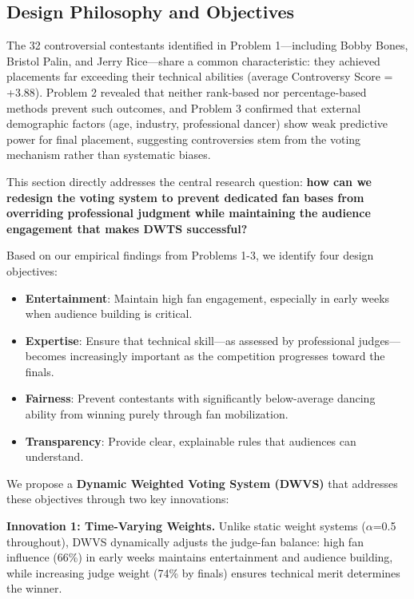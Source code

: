 \documentclass{mcmthesis}
\begin{document}
\subsection{Design Philosophy and Objectives}

The 32 controversial contestants identified in Problem 1---including Bobby Bones, Bristol Palin, and Jerry Rice---share a common characteristic: they achieved placements far exceeding their technical abilities (average Controversy Score = +3.88). Problem 2 revealed that neither rank-based nor percentage-based methods prevent such outcomes, and Problem 3 confirmed that external demographic factors (age, industry, professional dancer) show weak predictive power for final placement, suggesting controversies stem from the voting mechanism rather than systematic biases.

This section directly addresses the central research question: \textbf{how can we redesign the voting system to prevent dedicated fan bases from overriding professional judgment while maintaining the audience engagement that makes DWTS successful?}

Based on our empirical findings from Problems 1-3, we identify four design objectives:

\begin{itemize}
\item \textbf{Entertainment}: Maintain high fan engagement, especially in early weeks when audience building is critical.
\item \textbf{Expertise}: Ensure that technical skill---as assessed by professional judges---becomes increasingly important as the competition progresses toward the finals.
\item \textbf{Fairness}: Prevent contestants with significantly below-average dancing ability from winning purely through fan mobilization.
\item \textbf{Transparency}: Provide clear, explainable rules that audiences can understand.
\end{itemize}

We propose a \textbf{Dynamic Weighted Voting System (DWVS)} that addresses these objectives through two key innovations:

\textbf{Innovation 1: Time-Varying Weights.} Unlike static weight systems ($\alpha$=0.5 throughout), DWVS dynamically adjusts the judge-fan balance: high fan influence (66\%) in early weeks maintains entertainment and audience building, while increasing judge weight (74\% by finals) ensures technical merit determines the winner.
\end{document}
